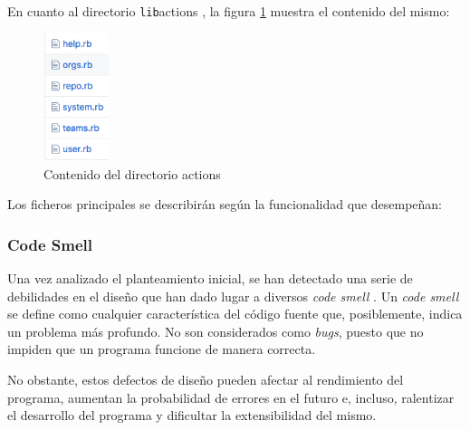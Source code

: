 En cuanto al directorio \verb /lib/actions , la figura \ref{fig:actions} muestra el contenido del mismo:
\begin{figure}[H]
  \begin{center}
  \includegraphics[width=0.17\textwidth]{images/actions}
  \caption{Contenido del directorio actions}
  \label{fig:actions}
  \end{center}
\end{figure}
\bigskip

Los ficheros principales se describirán según la funcionalidad que desempeñan:
\bigskip

\subsubsection{Code Smell}
Una vez analizado el planteamiento inicial, se han detectado una serie de debilidades en el diseño que han dado lugar a diversos {\it code smell} \cite{B11}.
Un {\it code smell} se define como cualquier característica del código fuente que, posiblemente, indica un problema más profundo. No son considerados como {\it bugs}, puesto que no impiden que un programa funcione de manera correcta.
\bigskip

No obstante, estos defectos de diseño pueden afectar al rendimiento del programa, aumentan la probabilidad de errores en el futuro e, incluso, ralentizar el desarrollo del programa y dificultar la extensibilidad del mismo.
\bigskip

